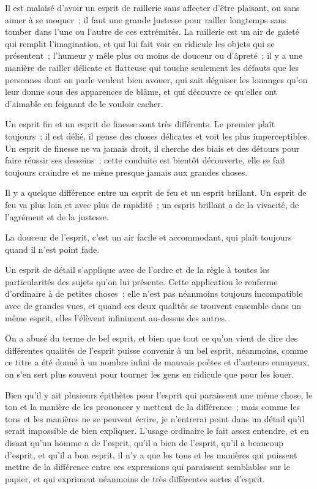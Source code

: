 \documentclass[french,twoside]{book} %
\begin{document}
Il est malaisé d’avoir un esprit de raillerie sans affecter d’être plaisant, ou sans aimer à se moquer ; il faut une grande justesse pour railler longtemps sans tomber dans l’une ou l’autre de ces extrémités. La raillerie est un air de gaieté qui remplit l’imagination, et qui lui fait voir en ridicule les objets qui se présentent ; l’humeur y mêle plus ou moins de douceur ou d’âpreté ; il y a une manière de railler délicate et flatteuse qui touche seulement les défauts que les personnes dont on parle veulent bien avouer, qui sait déguiser les louanges qu’on leur donne sous des apparences de blâme, et qui découvre ce qu’elles ont d’aimable en feignant de le vouloir cacher.\par
Un esprit fin et un esprit de finesse sont très différents. Le premier plaît toujours ; il est délié, il pense des choses délicates et voit les plus imperceptibles. Un esprit de finesse ne va jamais droit, il cherche des biais et des détours pour faire réussir ses desseins ; cette conduite est bientôt découverte, elle se fait toujours craindre et ne mène presque jamais aux grandes choses.\par
Il y a quelque différence entre un esprit de feu et un esprit brillant. Un esprit de feu va plus loin et avec plus de rapidité ; un esprit brillant a de la vivacité, de l’agrément et de la justesse.\par
La douceur de l’esprit, c’est un air facile et accommodant, qui plaît toujours quand il n’est point fade.\par
Un esprit de détail s’applique avec de l’ordre et de la règle à toutes les particularités des sujets qu’on lui présente. Cette application le renferme d’ordinaire à de petites choses ; elle n’est pas néanmoins toujours incompatible avec de grandes vues, et quand ces deux qualités se trouvent ensemble dans un même esprit, elles l’élèvent infiniment au-dessus des autres.\par
On a abusé du terme de bel esprit, et bien que tout ce qu’on vient de dire des différentes qualités de l’esprit puisse convenir à un bel esprit, néanmoins, comme ce titre a été donné à un nombre infini de mauvais poètes et d’auteurs ennuyeux, on s’en sert plus souvent pour tourner les gens en ridicule que pour les louer.\par
Bien qu’il y ait plusieurs épithètes pour l’esprit qui paraissent une même chose, le ton et la manière de les prononcer y mettent de la différence ; mais comme les tons et les manières ne se peuvent écrire, je n’entrerai point dans un détail qu’il serait impossible de bien expliquer. L’usage ordinaire le fait assez entendre, et en disant qu’un homme a de l’esprit, qu’il a bien de l’esprit, qu’il a beaucoup d’esprit, et qu’il a bon esprit, il n’y a que les tons et les manières qui puissent mettre de la différence entre ces expressions qui paraissent semblables sur le papier, et qui expriment néanmoins de très différentes sortes d’esprit.\par
\end{document}

